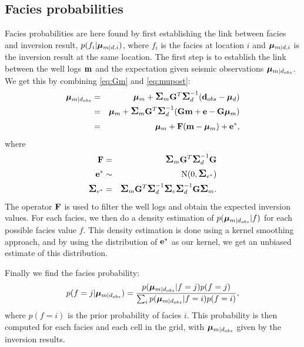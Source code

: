 \subsection{Facies probabilities}
\label{sec:facprobthe}
Facies probabilities are here found by first establishing the link between facies and inversion result, $p(f_i|\bm\mu_{m|d,i})$, where $f_i$ is the facies at location $i$ and $\bm\mu_{m|d,i}$ is the inversion result at the same location. The first step is to establish the link between the well logs $\mathbf{m}$ and the expectation given seismic observations $\bm\mu_{m|d_{obs}}$. We get this by combining \autoref{eq:Gm} and \autoref{eq:mupost}:
\begin{eqnarray}
\bm\mu_{m|d_{obs}} &=&\bm\mu_{m} +\mbox{\large\ensuremath{\boldsymbol{\Sigma}}}_{m}\mathbf{G}^T \mbox{\large\ensuremath{\boldsymbol{\Sigma}}}_{d}^{-1}
                           (\mathbf{d}_{obs}-\bm\mu_{d}) \nonumber \\
& = & \bm\mu_{m} +\mbox{\large\ensuremath{\boldsymbol{\Sigma}}}_{m}\mathbf{G}^T \mbox{\large\ensuremath{\boldsymbol{\Sigma}}}_{d}^{-1}
                           (\mathbf{G}\mathbf{m}+\mathbf{e}-\mathbf{G}\bm\mu_m) \nonumber\\
& = & \bm\mu_m + \mathbf{F}(\mathbf{m}-\bm\mu_m)+\mathbf{e}^*,
\end{eqnarray}
where
\begin{eqnarray}
\mathbf{F} & = &\mbox{\large\ensuremath{\boldsymbol{\Sigma}}}_{m}\mathbf{G}^T \mbox{\large\ensuremath{\boldsymbol{\Sigma}}}_{d}^{-1}\mathbf{G} \\
\mathbf{e}^* & \sim & \text{N}(0,\mbox{\large\ensuremath{\boldsymbol{\Sigma}}}_{e^*}) \\
\mbox{\large\ensuremath{\boldsymbol{\Sigma}}}_{e^*} & = & \mbox{\large\ensuremath{\boldsymbol{\Sigma}}}_{m}\mathbf{G}^T \mbox{\large\ensuremath{\boldsymbol{\Sigma}}}_{d}^{-1}\mbox{\large\ensuremath{\boldsymbol{\Sigma}}}_e\mbox{\large\ensuremath{\boldsymbol{\Sigma}}}_{d}^{-1}\mathbf{G}\mbox{\large\ensuremath{\boldsymbol{\Sigma}}}_m.
\end{eqnarray}
The operator $\mathbf{F}$ is used to filter the well logs and obtain the expected inversion values. For each facies, we then do a density estimation of $p(\bm\mu_{m|d_{obs}}|f)$ for each possible facies value $f$. This density estimation is done using a kernel smoothing approach, and by using the distribution of $\mathbf{e}^*$ as our kernel, we get an unbiased estimate of this distribution.

Finally we find the facies probability:
\begin{equation}
p(f=j|\bm\mu_{m|d_{obs}}) = \frac{p(\bm\mu_{m|d_{obs}}|f=j)p(f=j)}{\sum_i p(\bm\mu_{m|d_{obs}}|f=i)p(f=i)},
\end{equation}
where $p(f=i)$ is the prior probability of facies $i$.
This probability is then computed for each facies and each cell in the grid, with $\bm\mu_{m|d_{obs}}$ given by the inversion results. 